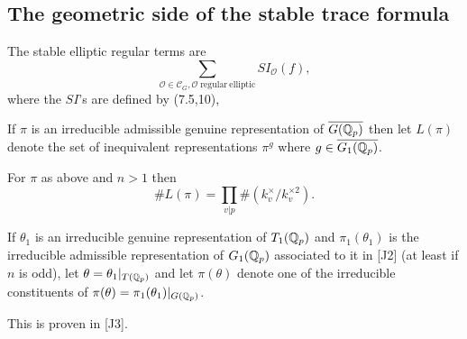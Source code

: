 \subsection{The geometric side of the stable trace formula}

The stable elliptic regular terms are 
\begin{equation}
\sum_{ {\mathcal{O}}\in {\mathcal{C}}_G ,
\mathcal{O}\;\mathrm{regular\ elliptic} }
SI_{\mathcal{O}}(f),
\end{equation}
where the $SI$'s are defined by (7.5,10), 

\begin{definition} If $\pi$ is an irreducible admissible
genuine representation of
$\overline{G({\Bbb Q}_p)}$ then let
$L(\pi)$ denote the set of inequivalent representations
$\pi^g$ where $g\in \overline{G_1(\mathbb{Q} _p)}$.
\end{definition}

\begin{remark} For $\pi$ as above and $n>1$ then
\[
\# L(\pi)=
\prod_{v|p}\#( k_v^\times/k_v^{\times 2}).
\]
\end{remark}

\begin{lemma} If $\theta_1$ is an irreducible genuine representation
of ${T_1({\Bbb Q}_p)}$ and $\pi_1(\theta_1)$ is the
irreducible admissible representation of
${G_1({\Bbb Q}_p)}$ associated to it in [J2]
(at least if $n$ is odd), let
$\theta =\theta_1|_{{T(\mathbb{Q} _p)}}$ and let
$\pi(\theta)$ denote one of the irreducible
constituents of
$\pi(\theta) =\pi_1(\theta_1)|_{G(\mathbb{Q} _p)}$.
\end{lemma}

This is proven in [J3].

